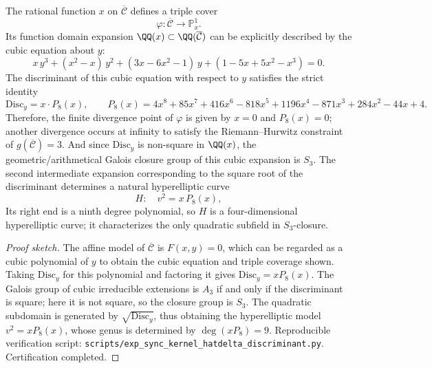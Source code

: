 \begin{proposition}\label{prop:sync-hatdelta-quotient-triple-cover-s3-discriminant}
The rational function \(x\) on \(\overline{\mathcal{C}}\) defines a triple cover
\[
\varphi:\overline{\mathcal{C}}\longrightarrow\mathbb{P}^1_x.
\]
Its function domain expansion \(\QQ(x)\subset\QQ(\overline{\mathcal{C}})\) can be explicitly described by the cubic equation about \(y\):
\[
x\,y^3+(x^2-x)\,y^2+(3x-6x^2-1)\,y+(1-5x+5x^2-x^3)=0.
\]
The discriminant of this cubic equation with respect to \(y\) satisfies the strict identity
\[
\mathrm{Disc}_y=x\cdot P_8(x),
\qquad
P_8(x)=4x^8+85x^7+416x^6-818x^5+1196x^4-871x^3+284x^2-44x+4.
\]
Therefore, the finite divergence point of \(\varphi\) is given by \(x=0\) and \(P_8(x)=0\); another divergence occurs at infinity to satisfy the Riemann--Hurwitz constraint of \(g(\overline{\mathcal{C}})=3\).
And since \(\mathrm{Disc}_y\) is non-square in \(\QQ(x)\), the geometric/arithmetical Galois closure group of this cubic expansion is \(S_3\).
The second intermediate expansion corresponding to the square root of the discriminant determines a natural hyperelliptic curve
\[
H:\quad v^2=x\,P_8(x),
\]
Its right end is a ninth degree polynomial, so \(H\) is a four-dimensional hyperelliptic curve; it characterizes the only quadratic subfield in \(S_3\)-closure.
\end{proposition}
\begin{proof}[Proof sketch]
The affine model of \(\overline{\mathcal{C}}\) is \(F(x,y)=0\), which can be regarded as a cubic polynomial of \(y\) to obtain the cubic equation and triple coverage shown.
Taking \(\mathrm{Disc}_y\) for this polynomial and factoring it gives \(\mathrm{Disc}_y=xP_8(x)\).
The Galois group of cubic irreducible extensions is \(A_3\) if and only if the discriminant is square; here it is not square, so the closure group is \(S_3\).
The quadratic subdomain is generated by \(\sqrt{\mathrm{Disc}_y}\), thus obtaining the hyperelliptic model \(v^2=xP_8(x)\), whose genus is determined by \(\deg(xP_8)=9\).
Reproducible verification script: \texttt{scripts/exp\_sync\_kernel\_hatdelta\_discriminant.py}. Certification completed.
\end{proof}

